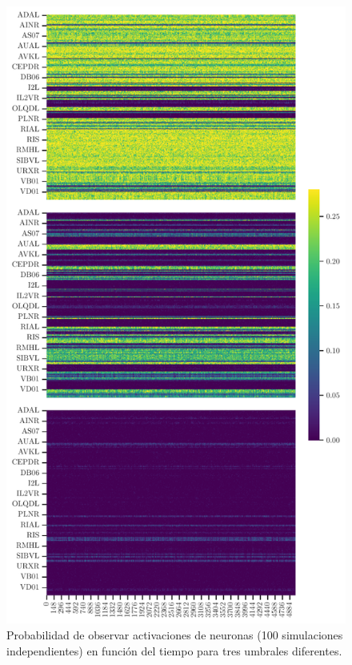 \begin{figure}[h!]
	\centering\includegraphics[width=\imsize]{probabilidad_hermafrodita.pdf}
	\caption[Probabilidad de observar activaciones de neuronas (100 simulaciones independientes) en función del tiempo para tres umbrales diferentes .]{Probabilidad de observar activaciones de neuronas (100 simulaciones independientes) en función del tiempo para tres umbrales diferentes.}\label{fig:probabilidad}
\end{figure}


